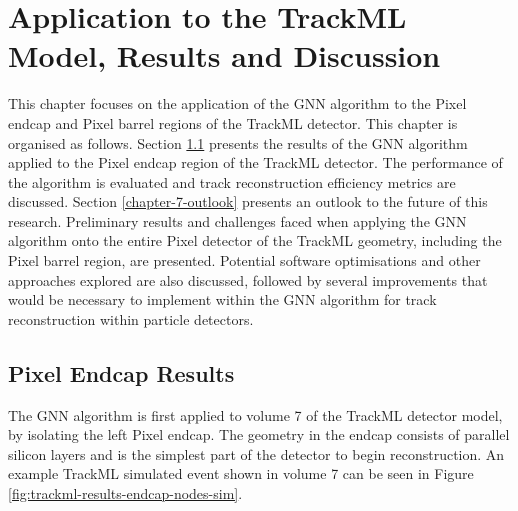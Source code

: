 
\chapter{Application to the TrackML Model, Results and Discussion}
\label{chapter-7}

This chapter focuses on the application of the GNN algorithm to the Pixel endcap and Pixel barrel regions of the TrackML detector. This chapter is organised as follows. Section \ref{chapter-7-endcap-results} presents the results of the GNN algorithm applied to the Pixel endcap region of the TrackML detector. The performance of the algorithm is evaluated and track reconstruction efficiency metrics are discussed. Section \ref{chapter-7-outlook} presents an outlook to the future of this research. Preliminary results and challenges faced when applying the GNN algorithm onto the entire Pixel detector of the TrackML geometry, including the Pixel barrel region, are presented. Potential software optimisations and other approaches explored are also discussed, followed by several improvements that would be necessary to implement within the GNN algorithm for track reconstruction within particle detectors.





\section{Pixel Endcap Results}
\label{chapter-7-endcap-results}

The GNN algorithm is first applied to volume 7 of the TrackML detector model, by isolating the left Pixel endcap. The geometry in the endcap consists of parallel silicon layers and is the simplest part of the detector to begin reconstruction. An example TrackML simulated event shown in volume 7 can be seen in Figure \ref{fig:trackml-results-endcap-nodes-sim}.


